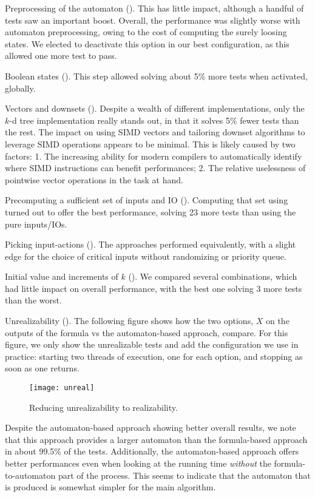 \documentclass[runningheads,a4paper]{llncs}
\begin{document}
\begin{compactitem}
\item Preprocessing of the automaton ().  This has little
  impact, although a handful of tests saw an important boost.  Overall, the
  performance was slightly worse with automaton preprocessing, owing to the cost
  of computing the surely loosing states.  We elected to deactivate this option
  in our best configuration, as this allowed one more test to pass.
\item Boolean states ().  This step allowed solving about
  5\% more tests when activated, globally.  
\item Vectors and downsets ().  Despite a wealth of different
  implementations, only the \(k\)-d tree implementation really stands out, in that
  it solves 5\% fewer tests than the rest.  The impact on using SIMD vectors and
  tailoring downset algorithms to leverage SIMD operations appears to be
  minimal.  This is likely caused by two factors: 1. The increasing ability for
  modern compilers to automatically identify where SIMD instructions can benefit
  performances; 2. The relative uselessness of pointwise vector operations in
  the task at hand.
\item Precomputing a sufficient set of inputs and IO ().
  Computing that set using  turned out to offer the best
  performance, solving 23 more tests than using the pure inputs/IOs.
\item Picking input-actions ().  The approaches performed
  equivalently, with a slight edge for the choice of critical inputs without
  randomizing or priority queue.
\item Initial value and increments of \(k\) ().  We compared several
  combinations, which had little impact on overall performance, with the best
  one solving 3 more tests than the worst.
\item Unrealizability (). The following figure shows how the
  two options, \(X\) on the outputs of the formula vs the automaton-based
  approach, compare.  For this figure, we only show the unrealizable tests and
  add the configuration we use in practice: starting two threads of execution,
  one for each option, and stopping as soon as one returns.
  \begin{figure}[h!]
    \centering
    \texttt{[image: unreal]}
    \caption{Reducing unrealizability to realizability.}
    \label{fig:unreal}
  \end{figure}

  Despite the automaton-based approach showing better overall results, we note
  that this approach provides a larger automaton than the formula-based approach
  in about 99.5\% of the tests.  Additionally, the automaton-based approach
  offers better performances even when looking at the running time
  \emph{without} the formula-to-automaton part of the process.  This seems to
  indicate that the automaton that is produced is somewhat simpler for the main
  algorithm.
\end{compactitem}
\end{document}
